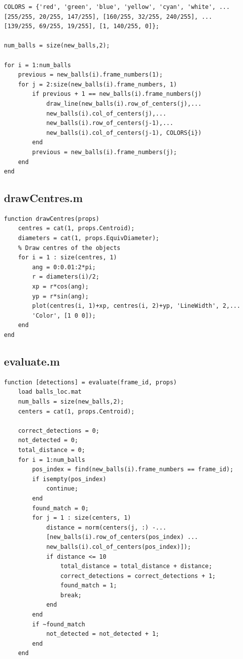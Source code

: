 \documentclass[12pt,a4paper]{article}
\begin{document}
\begin{appendices}
\begin{verbatim}
COLORS = {'red', 'green', 'blue', 'yellow', 'cyan', 'white', ...
[255/255, 20/255, 147/255], [160/255, 32/255, 240/255], ...
[139/255, 69/255, 19/255], [1, 140/255, 0]};

num_balls = size(new_balls,2);

for i = 1:num_balls
    previous = new_balls(i).frame_numbers(1);
    for j = 2:size(new_balls(i).frame_numbers, 1)
        if previous + 1 == new_balls(i).frame_numbers(j)
            draw_line(new_balls(i).row_of_centers(j),...
            new_balls(i).col_of_centers(j),...
            new_balls(i).row_of_centers(j-1),...
            new_balls(i).col_of_centers(j-1), COLORS{i})
        end
        previous = new_balls(i).frame_numbers(j);
    end
end
\end{verbatim}

\subsection{drawCentres.m}
\begin{verbatim}
function drawCentres(props)
    centres = cat(1, props.Centroid);
    diameters = cat(1, props.EquivDiameter);
    % Draw centres of the objects
    for i = 1 : size(centres, 1)
        ang = 0:0.01:2*pi; 
        r = diameters(i)/2;
        xp = r*cos(ang);
        yp = r*sin(ang);
        plot(centres(i, 1)+xp, centres(i, 2)+yp, 'LineWidth', 2,...
        'Color', [1 0 0]); 
    end
end
\end{verbatim}

\subsection{evaluate.m}
\begin{verbatim}
function [detections] = evaluate(frame_id, props)
    load balls_loc.mat
    num_balls = size(new_balls,2);
    centers = cat(1, props.Centroid);
    
    correct_detections = 0;
    not_detected = 0;
    total_distance = 0;
    for i = 1:num_balls
        pos_index = find(new_balls(i).frame_numbers == frame_id);
        if isempty(pos_index)
            continue;
        end
        found_match = 0;
        for j = 1 : size(centers, 1)
            distance = norm(centers(j, :) -...
            [new_balls(i).row_of_centers(pos_index) ...
            new_balls(i).col_of_centers(pos_index)]);
            if distance <= 10
                total_distance = total_distance + distance;
                correct_detections = correct_detections + 1;
                found_match = 1;
                break;
            end
        end
        if ~found_match
            not_detected = not_detected + 1;
        end
    end
 

\end{verbatim}
\end{appendices}
\end{document}
